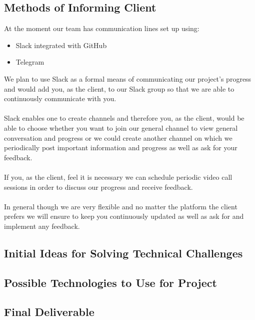 \documentclass{article}
\begin{document}
	\subsection{Methods of Informing Client}
		At the moment our team has communication lines set up using:
		\begin{itemize}
			\item Slack integrated with GitHub
			\item Telegram
		\end{itemize}
		We plan to use Slack as a formal means of communicating our project's progress and would add you, as the client, to our Slack group so that we are able to continuously communicate with you.\\\\
		Slack enables one to create channels and therefore you, as the client, would be able to choose whether you want to join our general channel to view general conversation and progress or we could create another channel on which we periodically post important information and progress as well as ask for your feedback.\\\\
		If you, as the client, feel it is necessary we can schedule periodic video call sessions in order to discuss our progress and receive feedback.\\\\
		In general though we are very flexible and no matter the platform the client prefers we will ensure to keep you continuously updated as well as ask for and implement any feedback.
		
	\subsection{Initial Ideas for Solving Technical Challenges}
	\subsection{Possible Technologies to Use for Project}
	\subsection{Final Deliverable}
\end{document}
